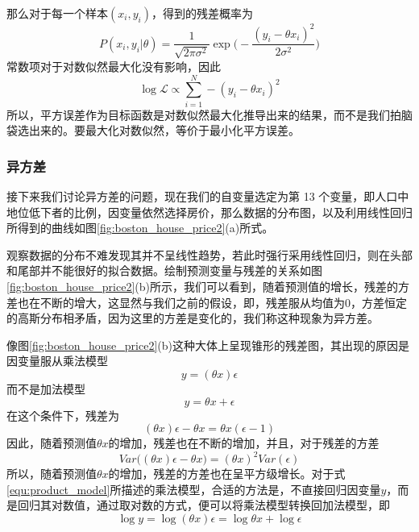 

那么对于每一个样本$(x_i, y_i)$，得到的残差概率为
\begin{equation}
	P(x_i, y_i|\theta) = \frac{1}{\sqrt{2\pi\sigma^2}}
	\exp\Bigg(-\frac{(y_i - \theta x_i)^2}{2\sigma^2}\Bigg)
\end{equation}
常数项对于对数似然最大化没有影响，因此
\begin{equation}
	\log \mathcal{L} \propto  \sum_{i=1}^N - (y_i - \theta x_i)^2
\end{equation}
所以，平方误差作为目标函数是对数似然最大化推导出来的结果，而不是我们拍脑袋选出来的。要最大化对数似然，等价于最小化平方误差。




\subsubsection{异方差} %
\label{ssub:异方差}
接下来我们讨论异方差的问题，现在我们的自变量选定为第 13 个变量，即⼈口中地位低下者的⽐例，因变量依然选择房价，那么数据的分布图，以及利用线性回归所得到的曲线如图\ref{fig:boston_house_price2}(a)所式。


观察数据的分布不难发现其并不呈线性趋势，若此时强行采用线性回归，则在头部和尾部并不能很好的拟合数据。绘制预测变量与残差的关系如图\ref{fig:boston_house_price2}(b)所示，我们可以看到，随着预测值的增长，残差的方差也在不断的增大，这显然与我们之前的假设，即，残差服从均值为0，方差恒定的高斯分布相矛盾，因为这里的方差是变化的，我们称这种现象为异方差。

像图\ref{fig:boston_house_price2}(b)这种大体上呈现锥形的残差图，其出现的原因是因变量服从乘法模型
\begin{equation}\label{equ:product_model}
	y = (\theta x)\epsilon
\end{equation}
而不是加法模型
\begin{equation}
	y = \theta x + \epsilon
\end{equation}
在这个条件下，残差为
\begin{equation}
	(\theta x)\epsilon - \theta x = \theta x(\epsilon - 1)
\end{equation}
因此，随着预测值$\theta x$的增加，残差也在不断的增加，并且，对于残差的方差
\begin{equation}
	Var\Big((\theta x)\epsilon - \theta x \Big) = (\theta x)^2 Var(\epsilon)
\end{equation}
所以，随着预测值$\theta x$的增加，残差的方差也在呈平方级增长。对于式\ref{equ:product_model}所描述的乘法模型，合适的方法是，不直接回归因变量$y$，而是回归其对数值，通过取对数的方式，便可以将乘法模型转换回加法模型，即
\begin{equation}
	\log y = \log (\theta x)\epsilon = \log\theta x + \log \epsilon
\end{equation}

